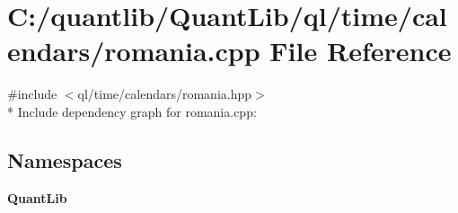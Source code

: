 \section{C\+:/quantlib/\+Quant\+Lib/ql/time/calendars/romania.cpp File Reference}
\label{romania_8cpp}
{\ttfamily \#include $<$ql/time/calendars/romania.\+hpp$>$}\\*
Include dependency graph for romania.\+cpp\+:
\subsection*{Namespaces}
\begin{DoxyCompactItemize}
\item 
 {\bf Quant\+Lib}
\end{DoxyCompactItemize}
